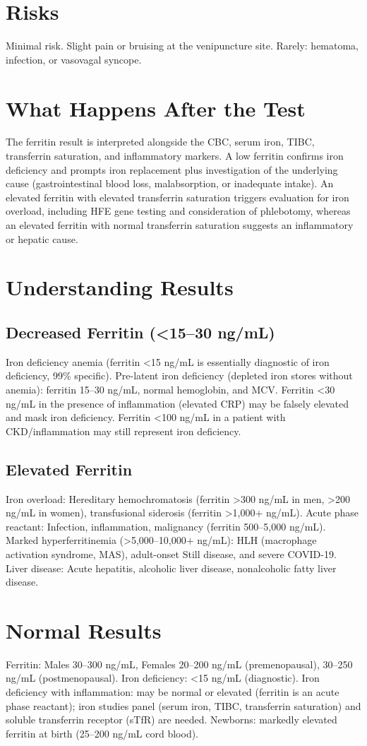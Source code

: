 \section*{Risks}
Minimal risk. Slight pain or bruising at the venipuncture site. Rarely: hematoma, infection, or vasovagal syncope.
\section*{What Happens After the Test}
The ferritin result is interpreted alongside the CBC, serum iron, TIBC, transferrin saturation, and inflammatory markers. A low ferritin confirms iron deficiency and prompts iron replacement plus investigation of the underlying cause (gastrointestinal blood loss, malabsorption, or inadequate intake). An elevated ferritin with elevated transferrin saturation triggers evaluation for iron overload, including HFE gene testing and consideration of phlebotomy, whereas an elevated ferritin with normal transferrin saturation suggests an inflammatory or hepatic cause.
\section*{Understanding Results}
\subsection*{Decreased Ferritin (<15--30 ng/mL)}
Iron deficiency anemia (ferritin <15 ng/mL is essentially diagnostic of iron deficiency, 99\% specific). Pre-latent iron deficiency (depleted iron stores without anemia): ferritin 15--30 ng/mL, normal hemoglobin, and MCV. Ferritin <30 ng/mL in the presence of inflammation (elevated CRP) may be falsely elevated and mask iron deficiency. Ferritin <100 ng/mL in a patient with CKD/inflammation may still represent iron deficiency.
\subsection*{Elevated Ferritin}
Iron overload: Hereditary hemochromatosis (ferritin >300 ng/mL in men, >200 ng/mL in women), transfusional siderosis (ferritin >1,000+ ng/mL). Acute phase reactant: Infection, inflammation, malignancy (ferritin 500--5,000 ng/mL). Marked hyperferritinemia (>5,000--10,000+ ng/mL): HLH (macrophage activation syndrome, MAS), adult-onset Still disease, and severe COVID-19. Liver disease: Acute hepatitis, alcoholic liver disease, nonalcoholic fatty liver disease.
\section*{Normal Results}
Ferritin: Males 30--300 ng/mL, Females 20--200 ng/mL (premenopausal), 30--250 ng/mL (postmenopausal). Iron deficiency: <15 ng/mL (diagnostic). Iron deficiency with inflammation: may be normal or elevated (ferritin is an acute phase reactant); iron studies panel (serum iron, TIBC, transferrin saturation) and soluble transferrin receptor (sTfR) are needed. Newborns: markedly elevated ferritin at birth (25--200 ng/mL cord blood).
